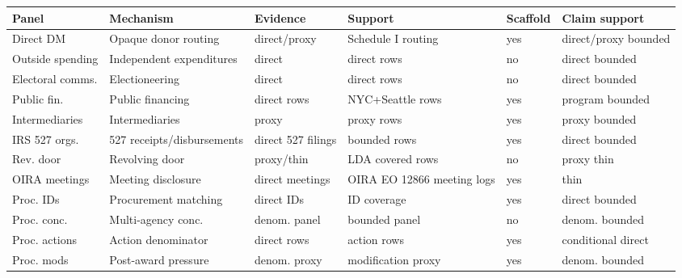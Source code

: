 \begingroup
\begin{center}
\begin{minipage}{\textwidth}
\centering
\scriptsize
\setlength{\tabcolsep}{1pt}
\begin{tabular*}{\textwidth}{@{\extracolsep{\fill}}llllll@{}}
\toprule
Panel & Mechanism & Evidence & Support & Scaffold & Claim support \\
\midrule
Direct DM & Opaque donor routing & direct/proxy & Schedule I routing & yes & direct/proxy bounded \\
Outside spending & Independent expenditures & direct & direct rows & no & direct bounded \\
Electoral comms. & Electioneering & direct & direct rows & no & direct bounded \\
Public fin. & Public financing & direct rows & NYC+Seattle rows & yes & program bounded \\
Intermediaries & Intermediaries & proxy & proxy rows & yes & proxy bounded \\
IRS 527 orgs. & 527 receipts/disbursements & direct 527 filings & bounded rows & yes & direct bounded \\
Rev. door & Revolving door & proxy/thin & LDA covered rows & no & proxy thin \\
OIRA meetings & Meeting disclosure & direct meetings & OIRA EO 12866 meeting logs & yes & thin \\
Proc. IDs & Procurement matching & direct IDs & ID coverage & yes & direct bounded \\
Proc. conc. & Multi-agency conc. & denom. panel & bounded panel & no & denom. bounded \\
Proc. actions & Action denominator & direct rows & action rows & yes & conditional direct \\
Proc. mods & Post-award pressure & denom. proxy & modification proxy & yes & denom. bounded \\
\bottomrule
\end{tabular*}
\par\smallskip
\captionsetup{hypcap=false}
\label{tab:validation-gaps}
\end{minipage}
\end{center}
\endgroup
